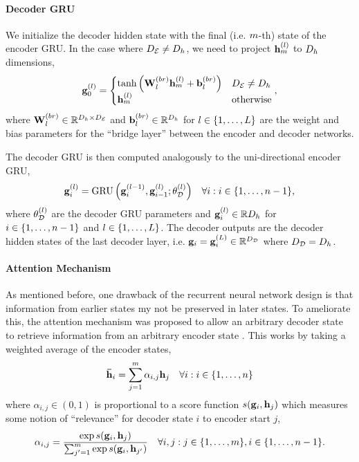 \paragraph{Decoder GRU}
We initialize the decoder hidden state with the final (i.e. $m$-th) state of the encoder GRU.
In the case where ${D_\mathcal{E}} \ne D_{h}$, we need to project $\mathbf{h}_{m}^{(l)}$ to $D_{h}$
dimensions,
\[ \mathbf{g}_0^{(l)} = \begin{cases} \tanh\left(\mathbf{W}^{(br)}_l \mathbf{h}_{m}^{(l)} + \mathbf{b}^{(br)}_l\right) & {D_\mathcal{E}} \ne D_{h}  \\
\mathbf{h}_{m}^{(l)} & \textrm{otherwise} \end{cases},\]
where $\mathbf{W}^{(br)}_l \in \mathbb{R}^{D_{h} \times {D_\mathcal{E}}}$ and $\mathbf{b}^{(br)}_l \in \mathbb{R}^{D_{h}}$
for $l \in \{1,\ldots,L\}$
are the weight and bias parameters for the ``bridge layer'' between the encoder and decoder networks.

The decoder GRU is then computed analogously to the uni-directional encoder GRU,
\begin{align*}
    \mathbf{g}_i^{(l)} & =\operatorname{GRU}\left(\mathbf{g}_i^{(l - 1)}, \mathbf{g}_{i-1}^{(l)}; \theta_\mathcal{D}^{(l)}\right) & \forall i : i \in \{1,\ldots, n-1\},
\end{align*}
where $\theta_\mathcal{D}^{(l)}$ are the decoder GRU parameters and
$ \mathbf{g}_i^{(l)} \in \mathbb{R}{D_{h}}$ for $i \in \{1,\ldots,n-1\}$ and $l \in \{1,\ldots,L\}$.
The decoder outputs are the decoder hidden states of the last decoder layer, i.e. $\mathbf{g}_i = \mathbf{g}^{(L)}_i \in \mathbb{R}^{{D_\mathcal{D}}}$ where ${D_\mathcal{D}}=D_{h}$.

\paragraph{Attention Mechanism}

As mentioned before, one drawback of the recurrent neural network design is that information
from earlier states my not be preserved in later states. To ameliorate this, the attention
mechanism was proposed to allow an arbitrary decoder state to retrieve information from an arbitrary
encoder state \citep{bahdanau2015}. This works by taking a weighted average of the encoder states,
\begin{align*}
    {\boldsymbol{\bar{\mathbf{h}}}}_i & = \sum^{m}_{j=1}\alpha_{i,j}\mathbf{h}_j & \forall i : i \in \{1,\ldots, n\}
\end{align*}
where $\alpha_{i,j} \in (0,1)$ is proportional to a score function $s(\mathbf{g}_i,\mathbf{h}_j)$ which 
measures some notion of ``relevance'' for decoder state $i$ to encoder start $j$,
\[\alpha_{i,j} = \frac{\exp s(\mathbf{g}_i, \mathbf{h}_j) }{ \sum_{j^\prime=1}^{m} \exp s(\mathbf{g}_i, \mathbf{h}_{j^\prime})} \quad \forall i,j : j \in \{1,\ldots,m\}, i \in \{1,\ldots,n-1\}.\]


